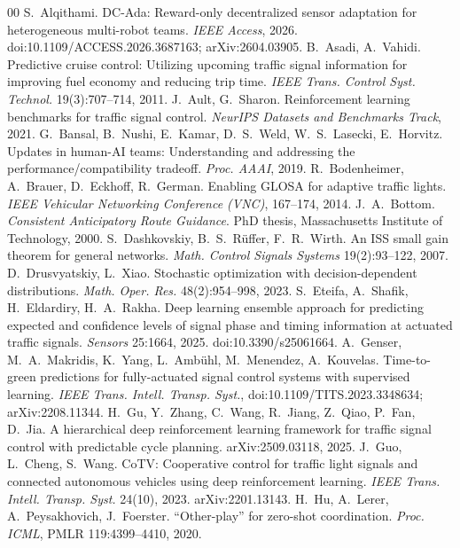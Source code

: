 \begin{thebibliography}{00}\footnotesize
{} S.~Alqithami. DC-Ada: Reward-only decentralized sensor adaptation for heterogeneous multi-robot teams. \emph{IEEE Access}, 2026. doi:10.1109/ACCESS.2026.3687163; arXiv:2604.03905.
 B.~Asadi, A.~Vahidi. Predictive cruise control: Utilizing upcoming traffic signal information for improving fuel economy and reducing trip time. \emph{IEEE Trans. Control Syst. Technol.} 19(3):707--714, 2011.
 J.~Ault, G.~Sharon. Reinforcement learning benchmarks for traffic signal control. \emph{NeurIPS Datasets and Benchmarks Track}, 2021.
 G.~Bansal, B.~Nushi, E.~Kamar, D.~S.~Weld, W.~S.~Lasecki, E.~Horvitz. Updates in human-AI teams: Understanding and addressing the performance/compatibility tradeoff. \emph{Proc. AAAI}, 2019.
 R.~Bodenheimer, A.~Brauer, D.~Eckhoff, R.~German. Enabling GLOSA for adaptive traffic lights. \emph{IEEE Vehicular Networking Conference (VNC)}, 167--174, 2014.
 J.~A.~Bottom. \emph{Consistent Anticipatory Route Guidance}. PhD thesis, Massachusetts Institute of Technology, 2000.
 S.~Dashkovskiy, B.~S.~R\"uffer, F.~R.~Wirth. An ISS small gain theorem for general networks. \emph{Math. Control Signals Systems} 19(2):93--122, 2007.
 D.~Drusvyatskiy, L.~Xiao. Stochastic optimization with decision-dependent distributions. \emph{Math. Oper. Res.} 48(2):954--998, 2023.
 S.~Eteifa, A.~Shafik, H.~Eldardiry, H.~A.~Rakha. Deep learning ensemble approach for predicting expected and confidence levels of signal phase and timing information at actuated traffic signals. \emph{Sensors} 25:1664, 2025. doi:10.3390/s25061664.
 A.~Genser, M.~A.~Makridis, K.~Yang, L.~Amb\"uhl, M.~Menendez, A.~Kouvelas. Time-to-green predictions for fully-actuated signal control systems with supervised learning. \emph{IEEE Trans. Intell. Transp. Syst.}, doi:10.1109/TITS.2023.3348634; arXiv:2208.11344.
 H.~Gu, Y.~Zhang, C.~Wang, R.~Jiang, Z.~Qiao, P.~Fan, D.~Jia. A hierarchical deep reinforcement learning framework for traffic signal control with predictable cycle planning. arXiv:2509.03118, 2025.
 J.~Guo, L.~Cheng, S.~Wang. CoTV: Cooperative control for traffic light signals and connected autonomous vehicles using deep reinforcement learning. \emph{IEEE Trans. Intell. Transp. Syst.} 24(10), 2023. arXiv:2201.13143.
 H.~Hu, A.~Lerer, A.~Peysakhovich, J.~Foerster. ``Other-play'' for zero-shot coordination. \emph{Proc. ICML}, PMLR 119:4399--4410, 2020.

\end{thebibliography}
